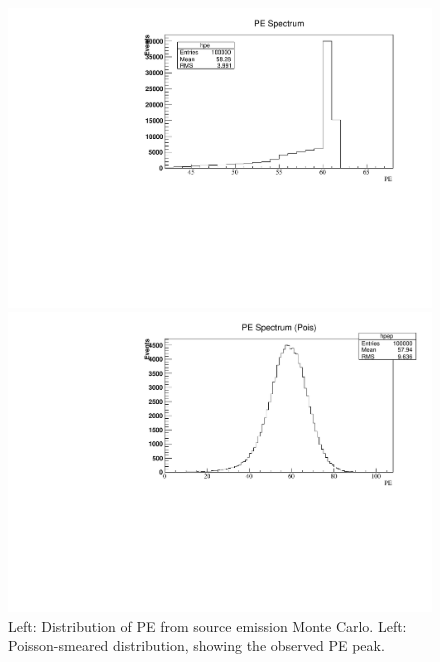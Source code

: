 \documentclass[aps,pra,notitlepage,groupedaddress]{revtex4-1}
\begin{document}
\begin{figure}
	\begin{minipage}{0.49\textwidth}
		\includegraphics[width=1.0\textwidth]{figures/rawpe}
	\end{minipage}
	\begin{minipage}{0.49\textwidth}
		\includegraphics[width=1.0\textwidth]{figures/poispe}
	\end{minipage}
	\caption{Left: Distribution of PE from source emission Monte Carlo. Left: Poisson-smeared distribution, showing the observed PE peak.\label{fig:pedist}}
\end{figure}

\end{document}
